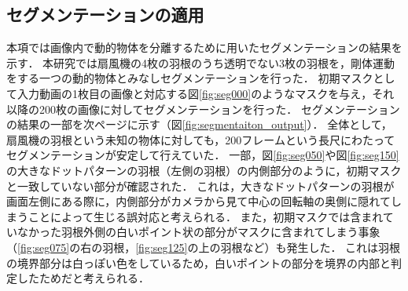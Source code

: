 \subsection{セグメンテーションの適用}\label{subsec:segmentation_eval}

本項では画像内で動的物体を分離するために用いたセグメンテーションの結果を示す．
本研究では扇風機の4枚の羽根のうち透明でない3枚の羽根を，剛体運動をする一つの動的物体とみなしセグメンテーションを行った．
初期マスクとして入力動画の1枚目の画像と対応する図\ref{fig:seg000}のようなマスクを与え，それ以降の200枚の画像に対してセグメンテーションを行った．
セグメンテーションの結果の一部を次ページに示す（図\ref{fig:segmentaiton_output}）．
全体として，扇風機の羽根という未知の物体に対しても，200フレームという長尺にわたってセグメンテーションが安定して行えていた．
一部，図\ref{fig:seg050}や図\ref{fig:seg150}の大きなドットパターンの羽根（左側の羽根）の内側部分のように，初期マスクと一致していない部分が確認された．
これは，大きなドットパターンの羽根が画面左側にある際に，内側部分がカメラから見て中心の回転軸の奥側に隠れてしまうことによって生じる誤対応と考えられる．
また，初期マスクでは含まれていなかった羽根外側の白いポイント状の部分がマスクに含まれてしまう事象（\ref{fig:seg075}の右の羽根，\ref{fig:seg125}の上の羽根など）も発生した．
これは羽根の境界部分は白っぽい色をしているため，白いポイントの部分を境界の内部と判定したためだと考えられる．

\newpage

